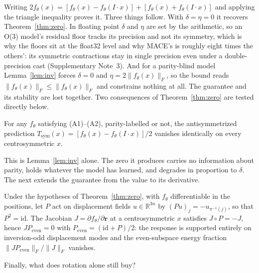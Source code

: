 Writing $2f_\theta(x) = [f_\theta(x)-f_\theta(I\!\cdot\!x)] + [f_\theta(x)+f_\theta(I\!\cdot\!x)]$ and applying the triangle inequality proves it. Three things follow. With $\delta=\eta=0$ it recovers Theorem~\ref{thm:zero}. In floating point $\delta$ and $\eta$ are set by the arithmetic, so an O(3) model's residual floor tracks its precision and not its symmetry, which is why the floors sit at the float32 level and why MACE's is roughly eight times the others': its symmetric contractions stay in single precision even under a double-precision cast (Supplementary Note~3). And for a parity-blind model Lemma~\ref{lem:inv} forces $\delta = 0$ and $\eta = 2\lVert f_\theta(x)\rVert_F$, so the bound reads $\lVert f_\theta(x)\rVert_F \le \lVert f_\theta(x)\rVert_F$ and constrains nothing at all. The guarantee and its stability are lost together. Two consequences of Theorem~\ref{thm:zero} are tested directly below.

\begin{corollary}\label{cor:sym}
For any $f_\theta$ satisfying (A1)--(A2), parity-labelled or not, the antisymmetrized prediction $T_{\mathrm{sym}}(x) = [f_\theta(x) - f_\theta(I\!\cdot\!x)]/2$ vanishes identically on every centrosymmetric $x$.
\end{corollary}

This is Lemma~\ref{lem:inv} alone. The zero it produces carries no information about parity, holds whatever the model has learned, and degrades in proportion to $\delta$. The next extends the guarantee from the value to its derivative.

\begin{corollary}\label{cor:jac}
Under the hypotheses of Theorem~\ref{thm:zero}, with $f_\theta$ differentiable in the positions, let $P$ act on displacement fields $u\in\mathbb{R}^{3n}$ by $(Pu)_{j} = -u_{\pi^{-1}(j)}$, so that $P^{2}=\mathrm{id}$. The Jacobian $J = \partial f_\theta/\partial\mathbf{r}$ at a centrosymmetric $x$ satisfies $J\circ P = -J$, hence $J P_{\mathrm{even}} = 0$ with $P_{\mathrm{even}} = (\mathrm{id}+P)/2$: the response is supported entirely on inversion-odd displacement modes and the even-subspace energy fraction $\lVert J P_{\mathrm{even}}\rVert_F/\lVert J\rVert_F$ vanishes.
\end{corollary}

Finally, what does rotation alone still buy?

